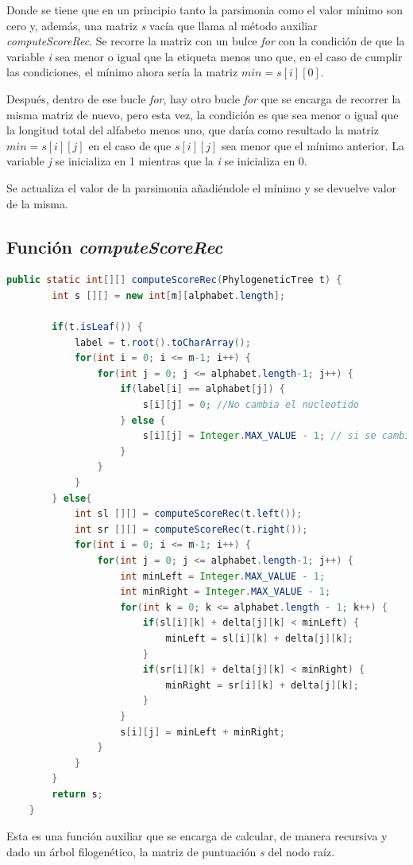 \documentclass[11pt,letterpaper]{article}
\begin{document}
Donde se tiene que en un principio tanto la parsimonia como el valor mínimo son cero y, además, una matriz \textit{s} vacía que llama al método auxiliar \textit{computeScoreRec}. Se recorre la matriz con un bulce \textit{for} con la condición de que la variable \textit{i} sea menor o igual que la etiqueta menos uno que, en el caso de cumplir las condiciones, el mínimo ahora sería la matriz $ min = s[i][0]$.

Después, dentro de ese bucle \textit{for}, hay otro bucle \textit{for} que se encarga de recorrer la misma matriz de nuevo, pero esta vez, la condición es que sea menor o igual que la longitud total del alfabeto menos uno, que daría como resultado la matriz $ min = s[i][j]$ en el caso de que $s[i][j]$ sea menor que el mínimo anterior. La variable \textit{j} se inicializa en 1 mientras que la \textit{i} se inicializa en 0.

Se actualiza el valor de la parsimonia añadiéndole el mínimo y se devuelve valor de la misma.

\subsection{Función \textit{computeScoreRec}}
\begin{lstlisting}[language=Java]
	public static int[][] computeScoreRec(PhylogeneticTree t) {
		int s [][] = new int[m][alphabet.length];
		
		if(t.isLeaf()) {
			label = t.root().toCharArray();
			for(int i = 0; i <= m-1; i++) {
				for(int j = 0; j <= alphabet.length-1; j++) {
					if(label[i] == alphabet[j]) {
						s[i][j] = 0; //No cambia el nucleotido
					} else {
						s[i][j] = Integer.MAX_VALUE - 1; // si se cambia el nucleotido
					}
				}
			}
		} else{
			int sl [][] = computeScoreRec(t.left());
			int sr [][] = computeScoreRec(t.right());
			for(int i = 0; i <= m-1; i++) {
				for(int j = 0; j <= alphabet.length-1; j++) {
					int minLeft = Integer.MAX_VALUE - 1;
					int minRight = Integer.MAX_VALUE - 1;
					for(int k = 0; k <= alphabet.length - 1; k++) {
						if(sl[i][k] + delta[j][k] < minLeft) {
							minLeft = sl[i][k] + delta[j][k];
						}
						if(sr[i][k] + delta[j][k] < minRight) {
							minRight = sr[i][k] + delta[j][k];
						}
					}
					s[i][j] = minLeft + minRight;
				}
			}
		}
		return s;
	}
\end{lstlisting}

Esta es una función auxiliar que se encarga de calcular, de manera recursiva y dado un árbol filogenético, la matriz de puntuación \textit{s} del nodo raíz.
\end{document}
